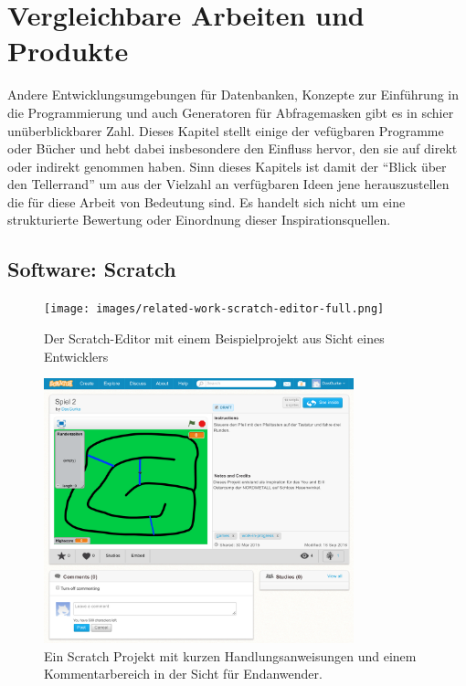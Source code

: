 \section{Vergleichbare Arbeiten und Produkte}
\label{sec:related-work}

Andere Entwicklungsumgebungen für Datenbanken, Konzepte zur Einführung in die Programmierung und auch Generatoren für Abfragemasken gibt es in schier unüberblickbarer Zahl. Dieses Kapitel stellt einige der vefügbaren Programme oder Bücher und hebt dabei insbesondere den Einfluss hervor, den sie auf \idename{} direkt oder indirekt genommen haben. Sinn dieses Kapitels ist damit der "`Blick über den Tellerrand"' um aus der Vielzahl an verfügbaren Ideen jene herauszustellen die für diese Arbeit von Bedeutung sind. Es handelt sich nicht um eine strukturierte Bewertung oder Einordnung dieser Inspirationsquellen.

\newpage

\subsection{Software: Scratch}

\begin{figure}[p]
  \centering \texttt{[image: images/related-work-scratch-editor-full.png]}
  \caption{Der Scratch-Editor mit einem Beispielprojekt aus Sicht eines Entwicklers}
  \label{fig:scratch-editor-full}
\end{figure}

\begin{figure}[p]
  \centering \includegraphics[width=0.8\textwidth]{images/related-work-scratch-project-full.png}
  \caption{Ein Scratch Projekt mit kurzen Handlungsanweisungen und einem Kommentarbereich in der Sicht für Endanwender.}
  \label{fig:scratch-enduser-full}
\end{figure}

